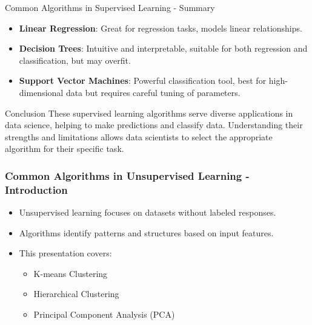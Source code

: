 \documentclass[aspectratio=169]{beamer}
\begin{document}
\begin{frame}[fragile]{Common Algorithms in Supervised Learning - Summary}
    \begin{itemize}
        \item \textbf{Linear Regression}: Great for regression tasks, models linear relationships.
        \item \textbf{Decision Trees}: Intuitive and interpretable, suitable for both regression and classification, but may overfit.
        \item \textbf{Support Vector Machines}: Powerful classification tool, best for high-dimensional data but requires careful tuning of parameters.
    \end{itemize}

    \begin{block}{Conclusion}
        These supervised learning algorithms serve diverse applications in data science, helping to make predictions and classify data. Understanding their strengths and limitations allows data scientists to select the appropriate algorithm for their specific task.
    \end{block}
\end{frame}

\begin{frame}[fragile]
    \frametitle{Common Algorithms in Unsupervised Learning - Introduction}
    \begin{itemize}
        \item Unsupervised learning focuses on datasets without labeled responses.
        \item Algorithms identify patterns and structures based on input features.
        \item This presentation covers:
        \begin{itemize}
            \item K-means Clustering
            \item Hierarchical Clustering
            \item Principal Component Analysis (PCA)
        \end{itemize}
    \end{itemize}
\end{frame}
\end{document}
